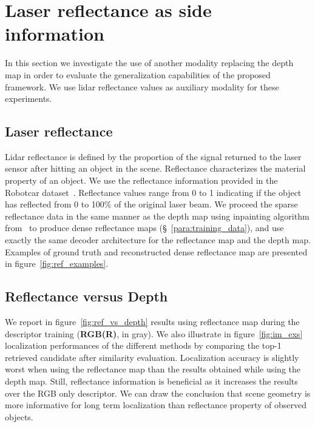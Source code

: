 \section{Laser reflectance as side information}

\label{sec:modality_ref}


In this section we investigate the use of another modality replacing the depth map in order to evaluate the generalization capabilities of the proposed framework. We use lidar reflectance values as auxiliary modality for these experiments.

\subsection{Laser reflectance}
Lidar reflectance is defined by the proportion of the signal returned to the laser sensor after hitting an object in the scene. Reflectance characterizes the material property of an object. We use the reflectance information provided in the Robotcar dataset~\cite{Maddern2016}. Reflectance values range from 0 to 1 indicating if the object has reflected from 0 to 100\% of the original laser beam. We proceed the sparse reflectance data in the same manner as the depth map using inpainting algorithm from~\cite{Bevilacqua2017} to produce dense reflectance maps (\S~\ref{para:training_data}), and use exactly the same decoder architecture for the reflectance map and the depth map. Examples of ground truth and reconstructed dense reflectance map are presented in figure~\ref{fig:ref_examples}.

\subsection{Reflectance versus Depth}

We report in figure~\ref{fig:ref_vs_depth} results using reflectance map during the descriptor training (\textbf{RGB(R)}, in gray). We also illustrate in figure~\ref{fig:im_exs} localization performances of the different methods by comparing the top-1 retrieved candidate after similarity evaluation. Localization accuracy is slightly worst when using the reflectance map than the results obtained while using the depth map. Still, reflectance information is beneficial as it increases the results over the RGB only descriptor. We can draw the conclusion that scene geometry is more informative for long term localization than reflectance property of observed objects.

